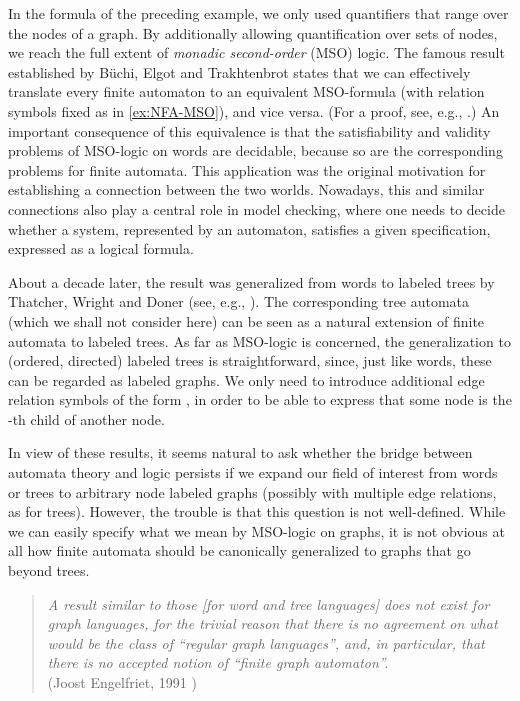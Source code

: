 \documentclass[a4paper,11pt,twoside]{report} \pdfoutput=1
\begin{document}
In the formula  of the preceding example, we only
used quantifiers that range over the nodes of a graph. By additionally
allowing quantification over sets of nodes, we reach the full extent
of \emph{monadic second-order} (MSO) logic. The famous result
established by Büchi, Elgot and Trakhtenbrot states that we can
effectively translate every finite automaton to an equivalent
MSO-formula (with relation symbols fixed as in \cref{ex:NFA-MSO}), and
vice versa. (For a proof, see, e.g., \cite[Thm~3.1]{Tho96}.) An
important consequence of this equivalence is that the satisfiability
and validity problems of MSO-logic on words are decidable, because so
are the corresponding problems for finite automata. This application
was the original motivation for establishing a connection between the
two worlds. Nowadays, this and similar connections also play a central
role in model checking, where one needs to decide whether a system,
represented by an automaton, satisfies a given specification,
expressed as a logical formula.

About a decade later, the result was generalized from words to labeled
trees by Thatcher, Wright \cite{TW68} and Doner \cite{Don70} (see,
e.g., \cite[Thm~3.8]{Tho96}). The corresponding tree automata
(which we shall not consider here) can be seen as a natural extension
of finite automata to labeled trees. As far as MSO-logic is concerned,
the generalization to (ordered, directed) labeled trees is
straightforward, since, just like words, these can be regarded as
labeled graphs. We only need to introduce additional edge relation
symbols of the form , in order to
be able to express that some node is the -th child of another node.

In view of these results, it seems natural to ask whether the bridge
between automata theory and logic persists if we expand our field of
interest from words or trees to arbitrary node labeled graphs
(possibly with multiple edge relations, as for trees). However, the
trouble is that this question is not well-defined. While we can easily
specify what we mean by MSO-logic on graphs, it is not obvious at all
how finite automata should be canonically generalized to graphs that
go beyond trees.

\begin{quote}
  \emph{A result similar to those \emph{[for word and tree languages]}
    does not exist for graph languages, for the trivial reason that
    there is no agreement on what would be the class of “regular graph
    languages”, and, in particular, that there is no accepted notion
    of “finite graph automaton”.} \\
  \hspace*{\fill} (Joost Engelfriet, 1991 \cite[p.~139]{Eng91})
\end{quote}
\end{document}
